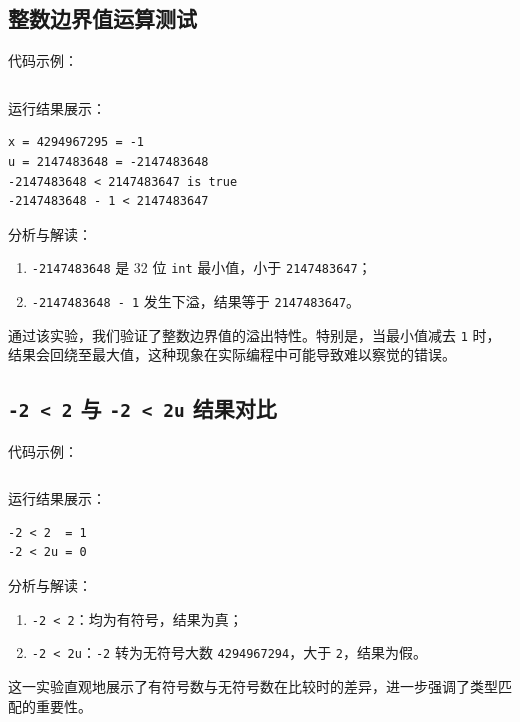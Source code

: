 \documentclass[12pt, a4paper]{academics}
\begin{document}
\subsection{整数边界值运算测试}

代码示例：

\inputminted{c}{../src/boundary.c}

运行结果展示：

\begin{verbatim}
x = 4294967295 = -1
u = 2147483648 = -2147483648
-2147483648 < 2147483647 is true
-2147483648 - 1 < 2147483647
\end{verbatim}

分析与解读：

\begin{enumerate}
    \item \texttt{-2147483648} 是 32 位 \texttt{int} 最小值，小于 \texttt{2147483647}；
    \item \texttt{-2147483648 - 1} 发生下溢，结果等于 \texttt{2147483647}。
\end{enumerate}

通过该实验，我们验证了整数边界值的溢出特性。特别是，当最小值减去 \texttt{1} 时，结果会回绕至最大值，这种现象在实际编程中可能导致难以察觉的错误。

\subsection{\texttt{-2 < 2} 与 \texttt{-2 < 2u} 结果对比}

代码示例：

\inputminted{c}{../src/compare.c}

运行结果展示：

\begin{verbatim}
-2 < 2  = 1
-2 < 2u = 0
\end{verbatim}

分析与解读：

\begin{enumerate}
    \item \texttt{-2 < 2}：均为有符号，结果为真；
    \item \texttt{-2 < 2u}：\texttt{-2} 转为无符号大数 \texttt{4294967294}，大于 \texttt{2}，结果为假。
\end{enumerate}

这一实验直观地展示了有符号数与无符号数在比较时的差异，进一步强调了类型匹配的重要性。
\end{document}
